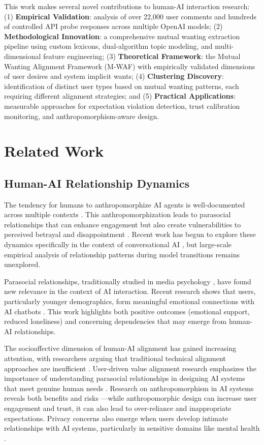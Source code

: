 \documentclass{article}
\begin{document}
This work makes several novel contributions to human-AI interaction research:
 (1) \textbf{Empirical Validation}: analysis of over 22{,}000 user comments and hundreds of controlled API probe responses across multiple OpenAI models; (2) \textbf{Methodological Innovation}: a comprehensive mutual wanting extraction pipeline using custom lexicons, dual-algorithm topic modeling, and multi-dimensional feature engineering; (3) \textbf{Theoretical Framework}: the Mutual Wanting Alignment Framework (M-WAF) with empirically validated dimensions of user desires and system implicit wants; (4) \textbf{Clustering Discovery}: identification of distinct user types based on mutual wanting patterns, each requiring different alignment strategies; and (5) \textbf{Practical Applications}: measurable approaches for expectation violation detection, trust calibration monitoring, and anthropomorphism-aware design.

\section{Related Work}

\subsection{Human-AI Relationship Dynamics}

The tendency for humans to anthropomorphize AI agents is well-documented across multiple contexts \citep{epley2007seeing, waytz2010see}. This anthropomorphization leads to parasocial relationships that can enhance engagement but also create vulnerabilities to perceived betrayal and disappointment \citep{horton1956mass}. Recent work has begun to explore these dynamics specifically in the context of conversational AI \citep{maeda2024parasocial, omeish2025between}, but large-scale empirical analysis of relationship patterns during model transitions remains unexplored.

Parasocial relationships, traditionally studied in media psychology \citep{rubin2019parasocial}, have found new relevance in the context of AI interaction. Recent research shows that users, particularly younger demographics, form meaningful emotional connections with AI chatbots \citep{edwards2024parasocial}. This work highlights both positive outcomes (emotional support, reduced loneliness) and concerning dependencies that may emerge from human-AI relationships.

The socioaffective dimension of human-AI alignment has gained increasing attention, with researchers arguing that traditional technical alignment approaches are insufficient \citep{kirk2025socioaffective}. User-driven value alignment research emphasizes the importance of understanding parasocial relationships in designing AI systems that meet genuine human needs \citep{fan2025alignment}. Research on anthropomorphism in AI systems reveals both benefits and risks \citep{pnas2025anthro, envsustain2025anthro}—while anthropomorphic design can increase user engagement and trust, it can also lead to over-reliance and inappropriate expectations. Privacy concerns also emerge when users develop intimate relationships with AI systems, particularly in sensitive domains like mental health \citep{mentalhealth2025privacy}.
\end{document}
